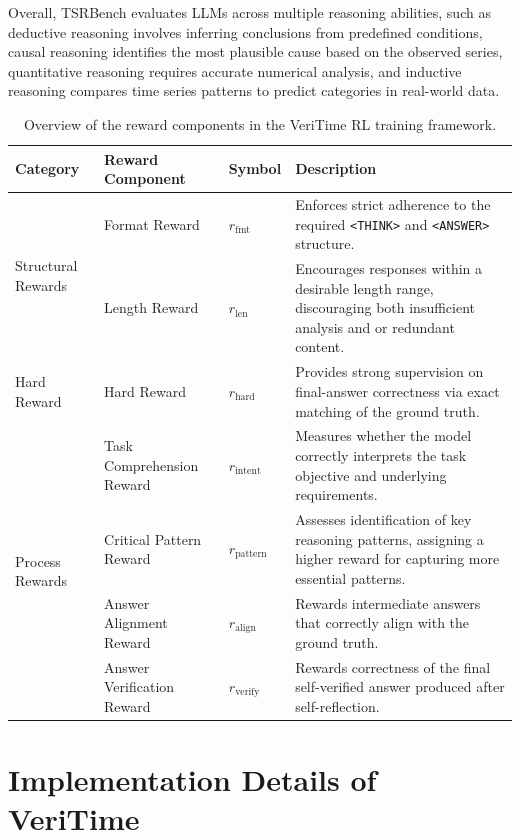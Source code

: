 \documentclass{article}
\theoremstyle{plain}
\theoremstyle{definition}
\theoremstyle{remark}
\begin{document}
Overall, TSRBench evaluates LLMs across multiple reasoning abilities, such as deductive reasoning involves inferring conclusions from predefined conditions, causal reasoning identifies the most plausible cause based on the observed series, quantitative reasoning requires accurate numerical analysis, and inductive reasoning compares time series patterns to predict categories in real-world data. 



\begin{table}[htbp]
\centering
\small
\caption{Overview of the reward components in the VeriTime RL training framework.}
\begin{tabular}{l l l p{8.2 cm}}
\toprule
\textbf{Category} & \textbf{Reward Component} & \textbf{Symbol} & \textbf{Description} \\
\midrule
\multirow[t]{2}{*}{Structural Rewards} 
& Format Reward & \( r_{\text{fmt}} \) 
& Enforces strict adherence to the required \texttt{<THINK>} and \texttt{<ANSWER>} structure. \\
& Length Reward & \( r_{\text{len}} \)
& Encourages responses within a desirable length range, discouraging both insufficient analysis and or redundant content. \\
\midrule
Hard Reward 
& Hard Reward & \( r_{\text{hard}} \) 
& Provides strong supervision on final-answer correctness via exact matching of the ground truth. \\
\midrule
\multirow[t]{4}{*}{Process Rewards}
& Task Comprehension Reward & \( r_{\text{intent}} \)
& Measures whether the model correctly interprets the task objective and underlying requirements. \\
& Critical Pattern Reward & \( r_{\text{pattern}} \)
& Assesses identification of key reasoning patterns, assigning a higher reward for capturing more essential patterns. \\
& Answer Alignment Reward & \( r_{\text{align}} \)
& Rewards intermediate answers that correctly align with the ground truth. \\
& Answer Verification Reward & \( r_{\text{verify}} \)
& Rewards correctness of the final self-verified answer produced after self-reflection. \\
\bottomrule
\end{tabular}
\label{tab:reward_summary}
\end{table}


\section{Implementation Details of VeriTime}
\label{abpx:reward_design}
\end{document}
